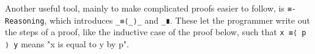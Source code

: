 Another useful tool, mainly to make complicated proofs easier to follow, is \texttt{≡-Reasoning},
which introduces \texttt{\_≡⟨\_⟩\_} and \texttt{\_∎}.
These let the programmer write out the steps of a proof, like the inductive case of the proof below,
such that \texttt{x ≡⟨ p ⟩ y} means "x is equal to y by p".
\begin{code}%
\>[0]\AgdaSpace{}%
\<%
\\
\>[0]\AgdaSpace{}%
\AgdaSymbol{:}%
\>[226I]\AgdaSymbol{\{}\AgdaSpace{}%
\AgdaSpace{}%
\AgdaSymbol{:}\AgdaSpace{}%
\AgdaSymbol{\}}\AgdaSpace{}%
\AgdaSymbol{\{}\AgdaSpace{}%
\AgdaSpace{}%
\AgdaSymbol{:}\AgdaSpace{}%
\AgdaSymbol{\}}\AgdaSpace{}%
\AgdaSpace{}%
\AgdaSymbol{(}\AgdaSpace{}%
\AgdaSymbol{:}\AgdaSpace{}%
\AgdaSpace{}%
\AgdaSpace{}%
\AgdaSymbol{)}\AgdaSpace{}%
\AgdaSymbol{(}\AgdaSpace{}%
\AgdaSymbol{:}\AgdaSpace{}%
\AgdaSpace{}%
\AgdaSpace{}%
\AgdaSymbol{)}\AgdaSpace{}%
\AgdaSymbol{(}\AgdaSpace{}%
\AgdaSymbol{:}\AgdaSpace{}%
\AgdaSpace{}%
\AgdaSpace{}%
\AgdaSymbol{)}\<%
\\
\>[.][@{}l@{}]\<[226I]%
\>[13]\AgdaSpace{}%
\AgdaSpace{}%
\AgdaSpace{}%
\AgdaSymbol{(}\AgdaSpace{}%
\AgdaOperator{\AgdaFunction{++}}\AgdaSpace{}%
\AgdaSymbol{)}\AgdaSpace{}%
\AgdaSpace{}%
\AgdaSymbol{(}\AgdaSpace{}%
\AgdaSpace{}%
\AgdaSymbol{)}\AgdaSpace{}%
\AgdaOperator{\AgdaFunction{++}}\AgdaSpace{}%
\AgdaSymbol{(}\AgdaSpace{}%
\AgdaSpace{}%
\AgdaSymbol{)}\<%
\\
\>[0]\AgdaSpace{}%
\AgdaSpace{}%
\AgdaInductiveConstructor{[]}\AgdaSpace{}%
\AgdaSpace{}%
\AgdaSymbol{=}\AgdaSpace{}%
\<%
\\
\>[0]\AgdaSpace{}%
\AgdaSpace{}%
\AgdaSymbol{(}\AgdaSpace{}%
\AgdaOperator{\AgdaInductiveConstructor{::}}\AgdaSpace{}%
\AgdaSymbol{)}\AgdaSpace{}%
\AgdaSpace{}%
\AgdaSymbol{=}\AgdaSpace{}%
\AgdaSpace{}%
\AgdaSpace{}%
\AgdaSymbol{((}\AgdaSpace{}%

\end{code}
